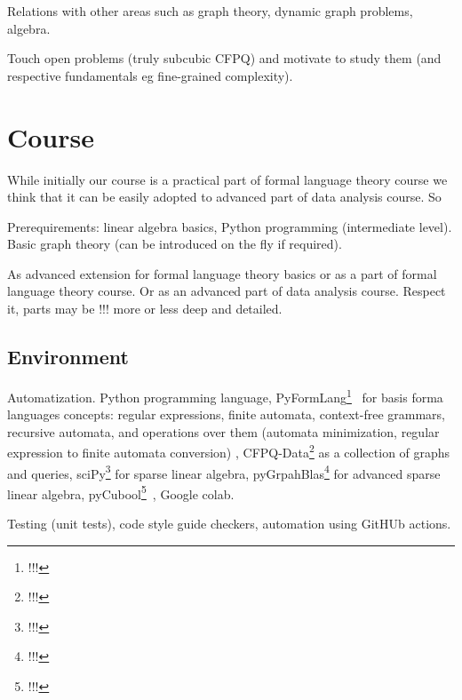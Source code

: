 \documentclass[sigconf]{acmart}
\begin{document}
Relations with other areas such as graph theory, dynamic graph problems, algebra.

Touch open problems (truly subcubic CFPQ) and motivate to study them (and respective fundamentals eg fine-grained complexity).

\section{Course}

While initially our course is a practical part of formal language theory course we think that it can be easily adopted to advanced part of data analysis course. So 

Prerequirements:  linear algebra basics, Python programming (intermediate level). Basic graph theory (can be introduced on the fly if required).

As advanced extension for formal language theory basics or as a part of formal language theory course. Or as an advanced part of data analysis course. Respect it, parts may be !!! more or less deep and detailed.



\subsection{Environment}

Automatization. Python programming language, PyFormLang\footnote{!!!}~\cite{10.1145/3408877.3432464} for basis forma languages concepts: regular expressions, finite automata, context-free grammars, recursive automata, and operations over them (automata minimization, regular expression to finite automata conversion) , CFPQ-Data\footnote{!!!} as a collection of graphs and queries, sciPy\footnote{!!!} for sparse linear algebra, pyGrpahBlas\footnote{!!!} for advanced sparse linear algebra, pyCubool\footnote{!!!}~\cite{!!!}, Google colab.

Testing (unit tests), code style guide checkers, automation using GitHUb actions.
\end{document}
